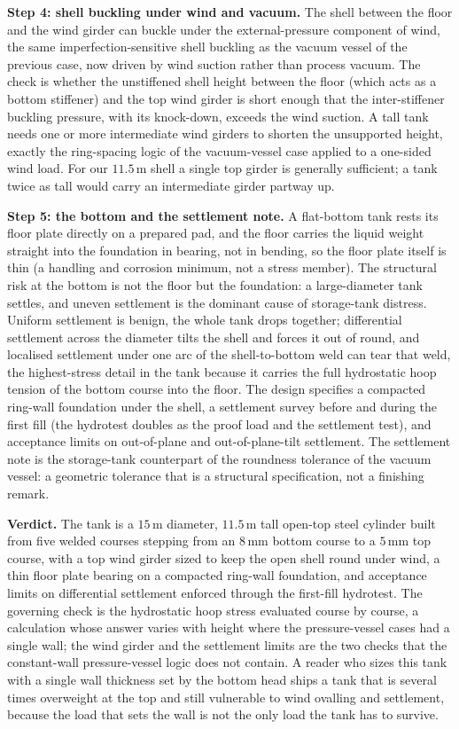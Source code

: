 \textbf{Step 4: shell buckling under wind and vacuum.} The shell between the
floor and the wind girder can buckle under the external-pressure component
of wind, the same imperfection-sensitive shell buckling as the vacuum
vessel of the previous case, now driven by wind suction rather than process
vacuum. The check is whether the unstiffened shell height between the floor
(which acts as a bottom stiffener) and the top wind girder is short enough
that the inter-stiffener buckling pressure, with its knock-down, exceeds the
wind suction. A tall tank needs one or more intermediate wind girders to
shorten the unsupported height, exactly the ring-spacing logic of the
vacuum-vessel case applied to a one-sided wind load. For our $11.5\,\si{
\meter}$ shell a single top girder is generally sufficient; a tank twice as
tall would carry an intermediate girder partway up.

\textbf{Step 5: the bottom and the settlement note.} A flat-bottom tank
rests its floor plate directly on a prepared pad, and the floor carries the
liquid weight straight into the foundation in bearing, not in bending, so
the floor plate itself is thin (a handling and corrosion minimum, not a
stress member). The structural risk at the bottom is not the floor but the
foundation: a large-diameter tank settles, and uneven settlement is the
dominant cause of storage-tank distress. Uniform settlement is benign, the
whole tank drops together; differential settlement across the diameter
tilts the shell and forces it out of round, and localised settlement under
one arc of the shell-to-bottom weld can tear that weld, the highest-stress
detail in the tank because it carries the full hydrostatic hoop tension of
the bottom course into the floor. The design specifies a compacted ring-wall
foundation under the shell, a settlement survey before and during the first
fill (the hydrotest doubles as the proof load and the settlement test), and
acceptance limits on out-of-plane and out-of-plane-tilt settlement. The
settlement note is the storage-tank counterpart of the roundness tolerance
of the vacuum vessel: a geometric tolerance that is a structural
specification, not a finishing remark.

\textbf{Verdict.} The tank is a $15\,\si{\meter}$ diameter, $11.5\,\si{
\meter}$ tall open-top steel cylinder built from five welded courses
stepping from an $8\,\si{\milli\meter}$ bottom course to a $5\,\si{
\milli\meter}$ top course, with a top wind girder sized to keep the open
shell round under wind, a thin floor plate bearing on a compacted ring-wall
foundation, and acceptance limits on differential settlement enforced
through the first-fill hydrotest. The governing check is the hydrostatic
hoop stress evaluated course by course, a calculation whose answer varies
with height where the pressure-vessel cases had a single wall; the wind
girder and the settlement limits are the two checks that the constant-wall
pressure-vessel logic does not contain. A reader who sizes this tank with a
single wall thickness set by the bottom head ships a tank that is several
times overweight at the top and still vulnerable to wind ovalling and
settlement, because the load that sets the wall is not the only load the
tank has to survive.

